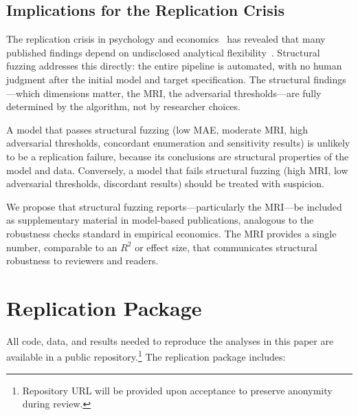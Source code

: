 \documentclass[manuscript,review,anonymous]{acmart}
\begin{document}
\subsection{Implications for the Replication Crisis}

The replication crisis in psychology and economics~\cite{ioannidis2005,open2015} has revealed that many published findings depend on undisclosed analytical flexibility~\cite{simmons2011}.
Structural fuzzing addresses this directly: the entire pipeline is automated, with no human judgment after the initial model and target specification.
The structural findings---which dimensions matter, the MRI, the adversarial thresholds---are fully determined by the algorithm, not by researcher choices.

A model that passes structural fuzzing (low MAE, moderate MRI, high adversarial thresholds, concordant enumeration and sensitivity results) is unlikely to be a replication failure, because its conclusions are structural properties of the model and data.
Conversely, a model that fails structural fuzzing (high MRI, low adversarial thresholds, discordant results) should be treated with suspicion.

We propose that structural fuzzing reports---particularly the MRI---be included as supplementary material in model-based publications, analogous to the robustness checks standard in empirical economics.
The MRI provides a single number, comparable to an $R^2$ or effect size, that communicates structural robustness to reviewers and readers.

\section{Replication Package}
\label{sec:replication}

All code, data, and results needed to reproduce the analyses in this paper are available in a public repository.\footnote{Repository URL will be provided upon acceptance to preserve anonymity during review.}
The replication package includes:
\end{document}
